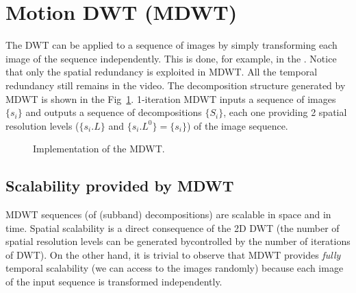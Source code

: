
\section{Motion DWT (MDWT)}
The DWT can be applied to a sequence of images by simply transforming
each image of the sequence independently. This is done, for example,
in the . Notice that only the spatial redundancy is exploited in
MDWT. All the temporal redundancy still remains in the video. The
decomposition structure generated by MDWT is shown in the
Fig~\ref{fig:forward_MDWT}. 1-iteration MDWT inputs a sequence of
images $\{s_i\}$ and outputs a sequence of decompositions $\{S_i\}$,
each one providing 2 spatial resolution levels ($\{s_i.L\}$ and
$\{s_i.L^0\}=\{s_i\}$) of the image sequence.

\begin{figure}
  \centering
  
  
  \caption{Implementation of the MDWT.} %
  \label{fig:forward_MDWT}
\end{figure}

\subsection{Scalability provided by MDWT}
MDWT sequences (of (subband) decompositions) are scalable in space and
in time. Spatial scalability is a direct consequence of the 2D DWT
(the number of spatial resolution levels can be generated bycontrolled by the number
of iterations of DWT). On the other hand, it is trivial to observe
that MDWT provides \emph{fully} temporal scalability (we can access to
the images randomly) because each image of the input sequence is
transformed independently.


